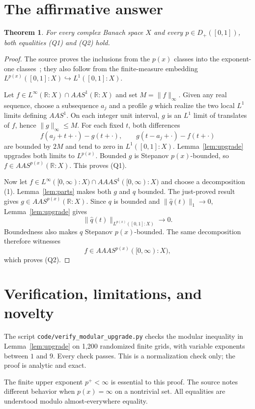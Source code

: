 \documentclass[10pt]{article}
\newtheorem{theorem}{Theorem}
\newcommand{\R}{\mathbb R}
\begin{document}
\section{The affirmative answer}
\begin{theorem}\label{thm:main}
For every complex Banach space $X$ and every $p\in D_+([0,1])$, both
equalities \emph{(Q1)} and \emph{(Q2)} hold.
\end{theorem}

\begin{proof}
The source proves the inclusions from the $p(x)$ classes into the exponent-one
classes~\cite[Theorem 3.7(i)]{source}; they also follow from the
finite-measure embedding $L^{p(x)}([0,1]:X)\hookrightarrow L^1([0,1]:X)$.

Let $f\in L^\infty(\R:X)\cap AAS^1(\R:X)$ and set $M=\|f\|_\infty$.
Given any real sequence, choose a subsequence $a_j$ and a profile $g$ which
realize the two local $L^1$ limits defining $AAS^1$.  On each integer unit
interval, $g$ is an $L^1$ limit of translates of $f$, hence
$\|g\|_\infty\le M$.  For each fixed $t$, both differences
\[
 f(a_j+t+\cdot)-g(t+\cdot),\qquad
 g(t-a_j+\cdot)-f(t+\cdot)
\]
are bounded by $2M$ and tend to zero in $L^1([0,1]:X)$.
Lemma~\ref{lem:upgrade} upgrades both limits to $L^{p(x)}$.
Bounded $g$ is Stepanov $p(x)$-bounded, so
$f\in AAS^{p(x)}(\R:X)$.  This proves (Q1).

Now let
$f\in L^\infty([0,\infty):X)\cap AAAS^1([0,\infty):X)$ and choose a
decomposition (1).  Lemma~\ref{lem:parts} makes both $g$ and $q$ bounded.
The just-proved result gives $g\in AAS^{p(x)}(\R:X)$.  Since $q$ is bounded
and $\|\widehat q(t)\|_1\to0$, Lemma~\ref{lem:upgrade} gives
\[
 \|\widehat q(t)\|_{L^{p(x)}([0,1]:X)}\longrightarrow0.
\]
Boundedness also makes $q$ Stepanov $p(x)$-bounded.  The same decomposition
therefore witnesses
\[
 f\in AAAS^{p(x)}([0,\infty):X),
\]
which proves (Q2).
\end{proof}

\section{Verification, limitations, and novelty}
The script \texttt{code/verify\_modular\_upgrade.py} checks the modular
inequality in Lemma~\ref{lem:upgrade} on 1,200 randomized finite grids, with
variable exponents between $1$ and $9$.  Every check passes.  This is a
normalization check only; the proof is analytic and exact.

The finite upper exponent $p^+<\infty$ is essential to this proof.  The source
notes different behavior when $p(x)=\infty$ on a nontrivial set.  All
equalities are understood modulo almost-everywhere equality.
\end{document}
